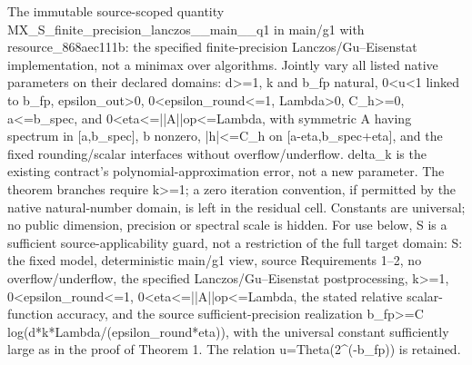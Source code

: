 \documentclass[10pt,a4paper]{article}
\begin{document}
\begingroup\raggedright\sloppy The immutable source-scoped quantity MX\_\allowbreak{}S\_\allowbreak{}finite\_\allowbreak{}precision\_\allowbreak{}lanczos\_\allowbreak{}\_\allowbreak{}main\_\allowbreak{}\_\allowbreak{}q1 in main/\allowbreak{}g1 with resource\_\allowbreak{}868aec111b:\allowbreak{} the specified finite-precision Lanczos/\allowbreak{}Gu{\AtlasUnicodeText –}\allowbreak{}Eisenstat implementation,\allowbreak{} not a minimax over algorithms. Jointly vary all listed native parameters on their declared domains:\allowbreak{} d>=\allowbreak{}1,\allowbreak{} k and b\_\allowbreak{}fp natural,\allowbreak{} 0<u<1 linked to b\_\allowbreak{}fp,\allowbreak{} epsilon\_\allowbreak{}out>0,\allowbreak{} 0<epsilon\_\allowbreak{}round<=\allowbreak{}1,\allowbreak{} Lambda>0,\allowbreak{} C\_\allowbreak{}h>=\allowbreak{}0,\allowbreak{} a<=\allowbreak{}b\_\allowbreak{}spec,\allowbreak{} and 0<eta<=\allowbreak{}||A||op<=\allowbreak{}Lambda,\allowbreak{} with symmetric A having spectrum in [a,\allowbreak{}b\_\allowbreak{}spec],\allowbreak{} b nonzero,\allowbreak{} |h|<=\allowbreak{}C\_\allowbreak{}h on [a-eta,\allowbreak{}b\_\allowbreak{}spec+eta],\allowbreak{} and the fixed rounding/\allowbreak{}scalar interfaces without overflow/\allowbreak{}underflow. delta\_\allowbreak{}k is the existing contract's polynomial-approximation error,\allowbreak{} not a new parameter. The theorem branches require k>=\allowbreak{}1;\allowbreak{} a zero iteration convention,\allowbreak{} if permitted by the native natural-number domain,\allowbreak{} is left in the residual cell. Constants are universal;\allowbreak{} no public dimension,\allowbreak{} precision or spectral scale is hidden. For use below,\allowbreak{} S is a sufficient source-applicability guard,\allowbreak{} not a restriction of the full target domain:\allowbreak{} S:\allowbreak{} the fixed model,\allowbreak{} deterministic main/\allowbreak{}g1 view,\allowbreak{} source Requirements 1{\AtlasUnicodeText –}\allowbreak{}2,\allowbreak{} no overflow/\allowbreak{}underflow,\allowbreak{} the specified Lanczos/\allowbreak{}Gu{\AtlasUnicodeText –}\allowbreak{}Eisenstat postprocessing,\allowbreak{} k>=\allowbreak{}1,\allowbreak{} 0<epsilon\_\allowbreak{}round<=\allowbreak{}1,\allowbreak{} 0<eta<=\allowbreak{}||A||op<=\allowbreak{}Lambda,\allowbreak{} the stated relative scalar-function accuracy,\allowbreak{} and the source sufficient-precision realization b\_\allowbreak{}fp>=\allowbreak{}C log(d*k*Lambda/\allowbreak{}(epsilon\_\allowbreak{}round*eta)),\allowbreak{} with the universal constant sufficiently large as in the proof of Theorem 1. The relation u=\allowbreak{}Theta(2\textasciicircum{}(-b\_\allowbreak{}fp)) is retained.\par\endgroup
\end{document}
